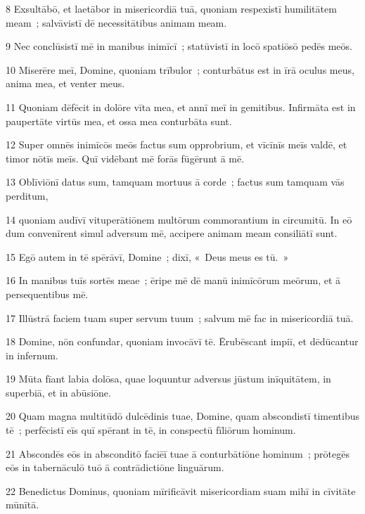 \psalmVerse
  {\phantom{00}8}
  {Exsultābō, et laetābor in misericordiā tuā, quoniam respexistī humilitātem meam~; salvāvistī dē necessitātibus animam meam.}


\psalmVerse
  {\phantom{00}9}
  {Nec conclūsistī mē in manibus inimīcī~; statūvistī in locō spatiōsō pedēs meōs.}


\psalmVerse
  {\phantom{0}10}
  {Miserēre meī, Domine, quoniam trībulor~; conturbātus est in īrā oculus meus, anima mea, et venter meus.}


\psalmVerse
  {\phantom{0}11}
  {Quoniam dēfēcit in dolōre vīta mea, et annī meī in gemitibus. Infirmāta est in paupertāte virtūs mea, et ossa mea conturbāta sunt.}


\psalmVerse
  {\phantom{0}12}
  {Super omnēs inimīcōs meōs factus sum opprobrium, et vīcīnīs meīs valdē, et timor nōtīs meīs. Quī vidēbant mē forās fūgērunt ā mē.}


\psalmVerse
  {\phantom{0}13}
  {Oblīviōnī datus sum, tamquam mortuus ā corde~; factus sum tamquam vās perditum,}


\psalmVerse
  {\phantom{0}14}
  {quoniam audīvī vituperātiōnem multōrum commorantium in circumitū. In eō dum convenīrent simul adversum mē, accipere animam meam consiliātī sunt.}


\psalmVerse
  {\phantom{0}15}
  {Egō autem in tē spērāvī, Domine~; dixī, «~Deus meus es tū.~»}


\psalmVerse
  {\phantom{0}16}
  {In manibus tuīs sortēs meae~; ēripe mē dē manū inimīcōrum meōrum, et ā persequentibus mē.}


\psalmVerse
  {\phantom{0}17}
  {Illūstrā faciem tuam super servum tuum~; salvum mē fac in misericordiā tuā.}


\psalmVerse
  {\phantom{0}18}
  {Domine, nōn confundar, quoniam invocāvī tē. Ērubēscant impiī, et dēdūcantur in infernum.}


\psalmVerse
  {\phantom{0}19}
  {Mūta fīant labia dolōsa, quae loquuntur adversus jūstum inīquitātem, in superbiā, et in abūsiōne.}


\psalmVerse
  {\phantom{0}20}
  {Quam magna multitūdō dulcēdinis tuae, Domine, quam abscondistī timentibus tē~; perfēcistī eīs quī spērant in tē, in conspectū fīliōrum hominum.}


\psalmVerse
  {\phantom{0}21}
  {Abscondēs eōs in absconditō faciēī tuae ā conturbātiōne hominum~; prōtegēs eōs in tabernāculō tuō ā contrādictiōne linguārum.}


\psalmVerse
  {\phantom{0}22}
  {Benedictus Dominus, quoniam mīrificāvit misericordiam suam mihī in cīvitāte mūnītā.}


